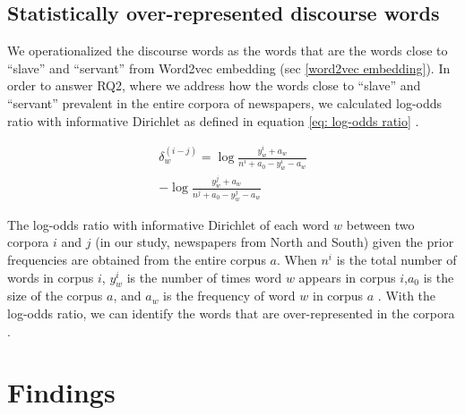 \documentclass[11pt]{article}
\begin{document}
\subsection{Statistically over-represented discourse words} \label{over-represented discourse words}
We operationalized the discourse words as the words that are the words close to ``slave'' and ``servant'' from Word2vec embedding (sec \ref{word2vec embedding}).
In order to answer RQ2, where we address how the words close to ``slave'' and ``servant'' prevalent in the entire corpora of newspapers, we calculated log-odds ratio with informative Dirichlet as defined in equation \ref{eq: log-odds ratio} \citep{monroe2008fightin}.

\begin{equation}
\begin{aligned}
  \delta_{w}^{(i-j)} = \log \frac{y_{w}^{i}+a_{w}}{n^{i}+a_{0}-y_{w}^{i}-a_{w}} \\
  - \log \frac{y_{w}^{j}+a_{w}}{n^{j}+a_{0}-y_{w}^{j}-a_{w}}
\end{aligned}
\label{eq: log-odds ratio}
\end{equation}

The log-odds ratio with informative Dirichlet of each word $w$ between two corpora $i$ and $j$ (in our study, newspapers from North and South) given the prior frequencies are obtained from the entire corpus $a$. When $n^{i}$ is the total number of words in corpus $i$, $y_{w}^{i}$ is the number of times word $w$ appears in corpus $i$,$a_{0}$ is the size of the corpus $a$, and
$a_{w}$ is the frequency of word $w$ in corpus $a$ \citep{kwak2020systematic}.
With the log-odds ratio, we can identify the words that are over-represented 
in the corpora \citep{park2023quantitative, park2024you}.

\section{Findings} \label{Findings}

\end{document}
